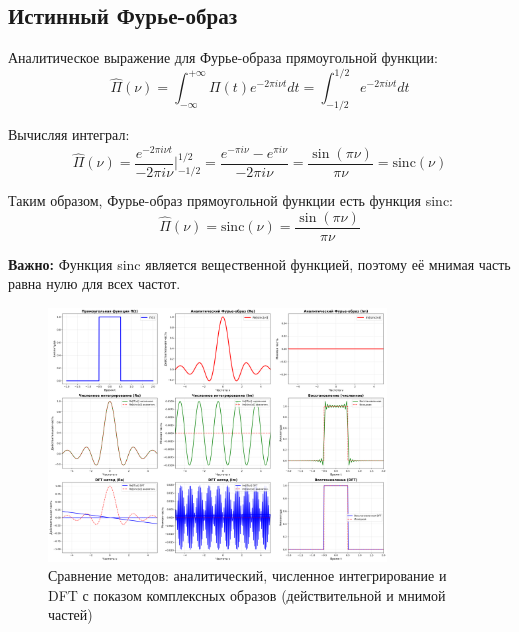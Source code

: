 \subsection*{Истинный Фурье-образ}

Аналитическое выражение для Фурье-образа прямоугольной функции:
\begin{equation}
\hat{\Pi}(\nu) = \int_{-\infty}^{+\infty} \Pi(t) e^{-2\pi i \nu t} dt = \int_{-1/2}^{1/2} e^{-2\pi i \nu t} dt
\end{equation}

Вычисляя интеграл:
\begin{equation}
\hat{\Pi}(\nu) = \frac{e^{-2\pi i \nu t}}{-2\pi i \nu} \Bigg|_{-1/2}^{1/2} = \frac{e^{-\pi i \nu} - e^{\pi i \nu}}{-2\pi i \nu} = \frac{\sin(\pi \nu)}{\pi \nu} = \text{sinc}(\nu)
\end{equation}

Таким образом, Фурье-образ прямоугольной функции есть функция sinc:
\begin{equation}
\hat{\Pi}(\nu) = \text{sinc}(\nu) = \frac{\sin(\pi \nu)}{\pi \nu}
\end{equation}

\textbf{Важно:} Функция sinc является вещественной функцией, поэтому её мнимая часть равна нулю для всех частот.

\begin{figure}[H]
    \centering
    \includegraphics[width=0.8\textwidth]{images/task1/analytical_and_trapz_comparison.png}
    \caption{Сравнение методов: аналитический, численное интегрирование и DFT с показом комплексных образов (действительной и мнимой частей)}
    \label{fig:analytical_trapz}
\end{figure}

